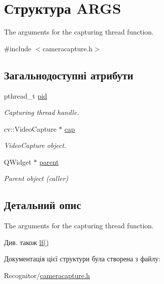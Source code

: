 \hypertarget{structARGS}{\section{Структура A\-R\-G\-S}
\label{structARGS}
}


The arguments for the capturing thread function.  




{\ttfamily \#include $<$cameracapture.\-h$>$}

\subsection*{Загальнодоступні атрибути}
\begin{DoxyCompactItemize}
\item 
\hypertarget{structARGS_af74ee694152c4be9de805a3fe7b709dc}{pthread\-\_\-t \hyperlink{structARGS_af74ee694152c4be9de805a3fe7b709dc}{pid}}\label{structARGS_af74ee694152c4be9de805a3fe7b709dc}

\begin{DoxyCompactList}\small\item\em Capturing thread handle. \end{DoxyCompactList}\item 
\hypertarget{structARGS_a6b299867eec1febb4d3ed313ac73f0d7}{cv\-::\-Video\-Capture $\ast$ \hyperlink{structARGS_a6b299867eec1febb4d3ed313ac73f0d7}{cap}}\label{structARGS_a6b299867eec1febb4d3ed313ac73f0d7}

\begin{DoxyCompactList}\small\item\em Video\-Capture object. \end{DoxyCompactList}\item 
\hypertarget{structARGS_a761da80183bdbfbf9a293c9ba1130d2c}{Q\-Widget $\ast$ \hyperlink{structARGS_a761da80183bdbfbf9a293c9ba1130d2c}{parent}}\label{structARGS_a761da80183bdbfbf9a293c9ba1130d2c}

\begin{DoxyCompactList}\small\item\em Parent object (caller) \end{DoxyCompactList}\end{DoxyCompactItemize}


\subsection{Детальний опис}
The arguments for the capturing thread function. 

\begin{DoxySeeAlso}{Див. також}
\hyperlink{cameracapture_8cpp_a769587c2f6dfb4e80afb00bb2048cc35}{lf()} 
\end{DoxySeeAlso}


Документація цієї структури була створена з файлу\-:\begin{DoxyCompactItemize}
\item 
Recognitor/\hyperlink{cameracapture_8h}{cameracapture.\-h}\end{DoxyCompactItemize}
